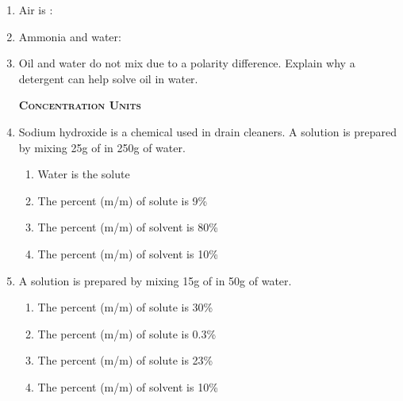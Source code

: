 \documentclass[main.tex]{subfiles}
\begin{document}
\begin{multicols*}{2}
\begin{enumerate}
\item Air is :
\begin{enumerate}[label=(\alph*)]
\end{enumerate}

\item Ammonia and water:
\begin{enumerate}[label=(\alph*)]
\end{enumerate}

\item Oil and water do not mix due to a polarity difference. Explain why a detergent can help solve oil in water.


{\raggedright\textsc{\textbf{Concentration Units }}\par}

\item Sodium hydroxide  is a chemical used in drain cleaners. A solution is prepared by mixing 25g of  in 250g of water.
\begin{enumerate}[label=(\alph*)]
\item Water is the solute %
\item The percent (m/m) of solute is 9\% %
\item The percent (m/m) of solvent is 80\% %
\item The percent (m/m) of solvent is 10\% %
\end{enumerate}

\item A solution is prepared by mixing 15g of  in 50g of water.
\begin{enumerate}[label=(\alph*)]
\item The percent (m/m) of solute is 30\% %
\item The percent (m/m) of solute is 0.3\% %
\item The percent (m/m) of solute is 23\% %
\item The percent (m/m) of solvent is 10\% %
\end{enumerate}



\end{enumerate}
\end{multicols*}
\end{document}
